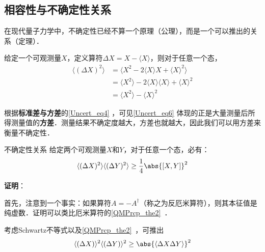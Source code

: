 


\subsection{相容性与不确定性关系}

在现代量子力学中，不确定性已经不算一个原理（公理），而是一个可以推出的关系（定理）．

给定一个可观测量$X$，定义算符$\Delta X=X-\langle X \rangle$，则对于任意一个态，
\begin{equation}\label{Uncert_eq6}
\begin{aligned}
\langle (\Delta X)^2 \rangle &= \langle X^2-2\langle X \rangle X + \langle X \rangle^2 \rangle\\
&=\langle X^2\rangle -2\langle X \rangle \langle X \rangle + \langle X \rangle^2\\
&=\langle X^2 \rangle - \langle X \rangle^2
\end{aligned}
\end{equation}

根据\textbf{标准差与方差}的\autoref{Uncert_eq4} ，可见\autoref{Uncert_eq6} 体现的正是大量测量后所得测量值的\textbf{方差}．测量结果不确定度越大，方差也就越大，因此我们可以用方差来衡量不确定性．

\begin{theorem}{不确定性关系}
给定两个可观测量$X$和$Y$，对于任意一个态，必有：
\begin{equation}\label{Uncert_eq9}
\langle (\Delta X)^2 \rangle\langle (\Delta Y)^2 \rangle \geq \frac{1}{4}\abs{[X, Y]}^2
\end{equation}
\end{theorem}


\textbf{证明}：

首先，注意到一个事实：如果算符$A=-A^\dagger$（称之为反厄米算符），则其本征值是纯虚数．证明可以类比厄米算符的\autoref{QMPrcp_the2}~．

考虑Schwartz不等式以及\autoref{QMPrcp_the2}~，可推出
\begin{equation}\label{Uncert_eq7}
\langle (\Delta X)\rangle^2\langle (\Delta Y)\rangle^2\geq \abs{\langle \Delta X \Delta Y \rangle}^2
\end{equation}

